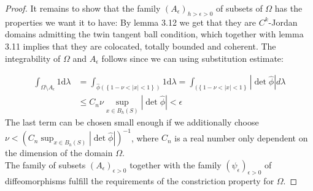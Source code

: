 \documentclass[11pt,a4paper,leqno]{report}
\numberwithin{equation}{chapter}
\begin{document}
\begin{proof}
It remains to show that the family $(A_\epsilon)_{h>\epsilon>0}$ of subsets of $\Omega$  has the properties we want it to have:
By lemma 3.12 we get that they are $C^k$-Jordan domains admitting the twin tangent ball condition, which together with lemma 3.11 implies that they are colocated, totally bounded and coherent. The integrability of $\Omega$ and $A_\epsilon$ follows since we can using substitution estimate:

\begin{align*}\int_{\Omega\setminus A_\epsilon} 1\mathrm{d}\lambda&=\int_{\hat{\phi}(\left\{1-\nu<|x|<1\right\})} 1\mathrm{d}\lambda=\int_{(\left\{1-\nu<|x|<1\right\}} |\det\hat{\phi}|d\lambda\\
&\leq C_n\nu\sup_{x\in B_h(S)}|\det\hat{\phi}|<\epsilon\end{align*}
The last term can be chosen small enough if we additionally choose $\nu<(C_n\sup_{x\in B_h(S)}|\det\hat{\phi}|)^{-1}$, where $C_n$ is a real number only dependent on the dimension of the domain $\Omega$.\\
The family of subsets $(A_\epsilon)_{\epsilon>0}$ together with the family $(\psi_\epsilon)_{\epsilon>0}$ of diffeomorphisms fulfill the requirements of the constriction property for $\Omega$.





\end{proof}
\end{document}

